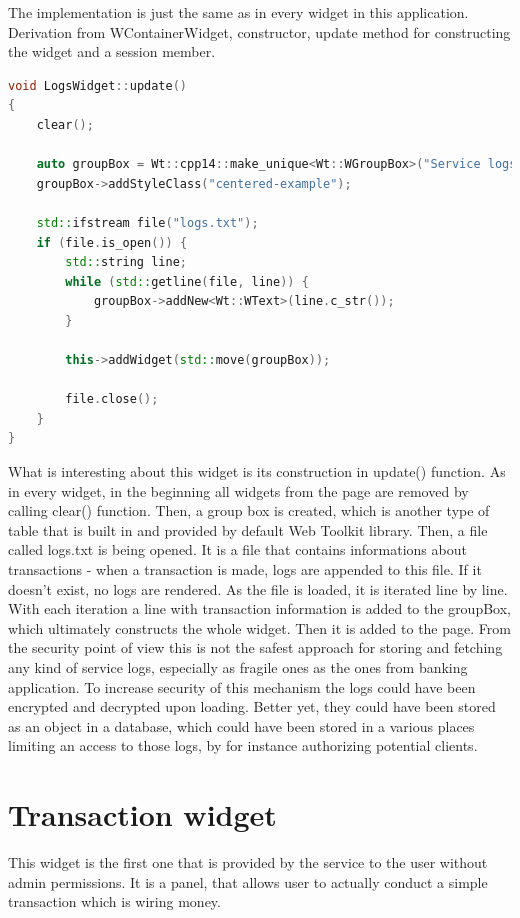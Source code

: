 \documentclass[a4paper,12pt]{book}
\begin{document}
{{\bigskip
The implementation is just the same as in every widget in this application. Derivation from WContainerWidget, constructor, update method for constructing the widget and a session member.

\bigskip
\begin{lstlisting}[frame=single, basicstyle=\small, language=C++, caption={LogsWidget::update() function.}, captionpos=b]
void LogsWidget::update()
{
	clear();

	auto groupBox = Wt::cpp14::make_unique<Wt::WGroupBox>("Service logs");
	groupBox->addStyleClass("centered-example");

	std::ifstream file("logs.txt");
	if (file.is_open()) {
		std::string line;
		while (std::getline(file, line)) {
			groupBox->addNew<Wt::WText>(line.c_str());
		}

		this->addWidget(std::move(groupBox));

		file.close();
	}
}
\end{lstlisting}

What is interesting about this widget is its construction in update() function. As in every widget, in the beginning all widgets from the page are removed by calling clear() function. Then, a group box is created, which is  another type of table that is built in and provided by default Web Toolkit library. Then, a file called logs.txt is being opened. It is a file that contains informations about transactions - when a transaction is made, logs are appended to this file. If it doesn't exist, no logs are rendered. As the file is loaded, it is iterated line by line. With each iteration a line with transaction information is added to the groupBox, which ultimately constructs the whole widget. Then it is added to the page. From the security point of view this is not the safest approach for storing and fetching any kind of service logs, especially as fragile ones as the ones from banking application. To increase security of this mechanism the logs could have been encrypted and decrypted upon loading. Better yet, they could have been stored as an object in a database, which could have been stored in a various places limiting an access to those logs, by for instance authorizing potential clients. 
}

\section*{Transaction widget}
{
This widget is the first one that is provided by the service to the user without admin permissions. It is a panel, that allows user to actually conduct a simple transaction which is wiring money.

}}
\end{document}
